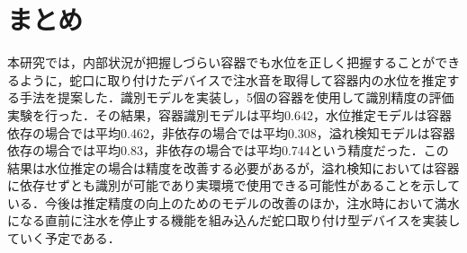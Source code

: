 \documentclass[submit,techrep,noauthor]{ipsj}
\begin{document}
\section{まとめ}
\label{sec:conclude}
本研究では，内部状況が把握しづらい容器でも水位を正しく把握することができるように，蛇口に取り付けたデバイスで注水音を取得して容器内の水位を推定する手法を提案した．識別モデルを実装し，5個の容器を使用して識別精度の評価実験を行った．その結果，容器識別モデルは平均0.642，水位推定モデルは容器依存の場合では平均0.462，非依存の場合では平均0.308，溢れ検知モデルは容器依存の場合では平均0.83，非依存の場合では平均0.744という精度だった．この結果は水位推定の場合は精度を改善する必要があるが，溢れ検知においては容器に依存せずとも識別が可能であり実環境で使用できる可能性があることを示している．今後は推定精度の向上のためのモデルの改善のほか，注水時において満水になる直前に注水を停止する機能を組み込んだ蛇口取り付け型デバイスを実装していく予定である．







\end{document}
